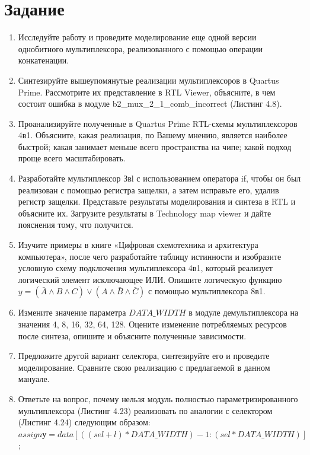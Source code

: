 \documentclass[a4paper,14pt]{article}
\begin{document}

\tableofcontents
\pagebreak
\section{Задание}

\begin{enumerate}
	\item Исследуйте работу и проведите моделирование еще одной версии однобитного
	мультиплексора, реализованного с помощью операции конкатенации.
	
	\item Синтезируйте вышеупомянутые реализации мультиплексоров в Quartus Prime. Рассмотрите
	их представление в RTL Viewer, объясните, в чем состоит ошибка в модуле
	b2\_mux\_2\_1\_comb\_incorrect (Листинг 4.8).
	
	\item Проанализируйте полученные в Quartus Prime RТL-схемы мультиплексоров 4в1. Объясните,	какая реализация, по Вашему мнению, является наиболее быстрой; какая занимает меньше всего пространства на чипе; какой подход проще всего масштабировать.
	
	\item Разработайте мультиплексор Звl с использованием оператора if, чтобы он был реализован с	помощью регистра защелки, а затем исправьте его, удалив регистр защелки. Представьте	результаты моделирования и синтеза в RTL и объясните их. Загрузите результаты в Technology map viewer и дайте пояснения тому, что получится.
	
	\item Изучите примеры в книге «Цифровая схемотехника и архитектура компьютера», после чего	разработайте таблицу истинности и изобразите условную схему подключения мультиплексора 4в1, который реализует логический элемент исключающее ИЛИ. Опишите	логическую функцию $y = (\bar A \wedge B \wedge C) \vee (A \wedge \bar B \wedge \bar C)$ с помощью мультиплексора 8в1.
	
	\item Измените значение параметра $DATA\_WIDTH$ в модуле демультиплексора на значения 4, 8, 16, 32, 64, 128. Оцените изменение потребляемых ресурсов после синтеза, опишите и объясните полученные зависимости.
	
	\item Предложите другой вариант селектора, синтезируйте его и проведите моделирование. Сравните свою реализацию с предлагаемой в данном мануале.
	
	\item Ответьте на вопрос, почему нельзя модуль полностью параметризированного мультиплексора (Листинг 4.23) реализовать по аналогии с селектором (Листинг 4.24) следующим образом: $assign у= data[((sel+l)*DATA\_WIDTH) - 1: (sel*DATA\_WIDTH)]$;
	
\end{enumerate}
\end{document}
